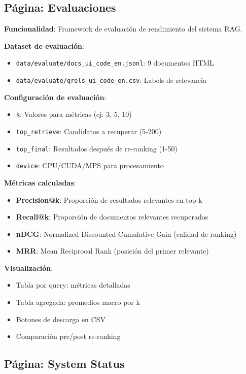 \documentclass[12pt,a4paper]{article}
\begin{document}
\subsection{Página: Evaluaciones}

\textbf{Funcionalidad}: Framework de evaluación de rendimiento del sistema RAG.

\textbf{Dataset de evaluación}:
\begin{itemize}
    \item \texttt{data/evaluate/docs\_ui\_code\_en.jsonl}: 9 documentos HTML
    \item \texttt{data/evaluate/qrels\_ui\_code\_en.csv}: Labels de relevancia
\end{itemize}

\textbf{Configuración de evaluación}:
\begin{itemize}
    \item \texttt{k}: Valores para métricas (ej: 3, 5, 10)
    \item \texttt{top\_retrieve}: Candidatos a recuperar (5-200)
    \item \texttt{top\_final}: Resultados después de re-ranking (1-50)
    \item \texttt{device}: CPU/CUDA/MPS para procesamiento
\end{itemize}

\textbf{Métricas calculadas}:
\begin{itemize}
    \item \textbf{Precision@k}: Proporción de resultados relevantes en top-k
    \item \textbf{Recall@k}: Proporción de documentos relevantes recuperados
    \item \textbf{nDCG}: Normalized Discounted Cumulative Gain (calidad de ranking)
    \item \textbf{MRR}: Mean Reciprocal Rank (posición del primer relevante)
\end{itemize}

\textbf{Visualización}:
\begin{itemize}
    \item Tabla por query: métricas detalladas
    \item Tabla agregada: promedios macro por k
    \item Botones de descarga en CSV
    \item Comparación pre/post re-ranking
\end{itemize}

\subsection{Página: System Status}
\end{document}
